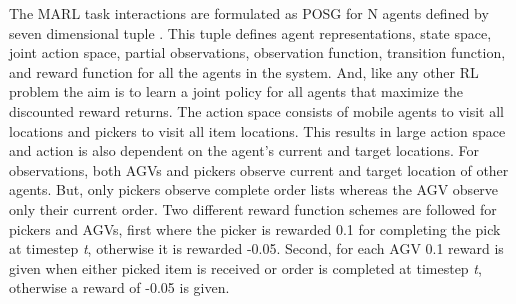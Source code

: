 \documentclass{article}
\begin{document}
The MARL task interactions are formulated as POSG for N agents defined by seven dimensional tuple \cite{hansen2004dynamic}.
This tuple defines agent representations, state space, joint action space, partial observations, observation function, transition function, and reward function for all the agents in the system.
And, like any other RL problem the aim is to learn a joint policy for all agents that maximize the discounted reward returns.
The action space consists of mobile agents to visit all locations and pickers to visit all item locations.
This results in large action space and action is also dependent on the agent’s current and target locations.
For observations, both AGVs and pickers observe current and target location of other agents. But, only pickers observe complete order lists whereas the AGV observe only their current order.
Two different reward function schemes are followed for pickers and AGVs, first where the picker is rewarded 0.1 for completing the pick at timestep \textit{t}, otherwise it is rewarded -0.05.
Second, for each AGV 0.1 reward is given when either picked item is received or order is completed at timestep \textit{t}, otherwise a reward of -0.05 is given.
\end{document}
